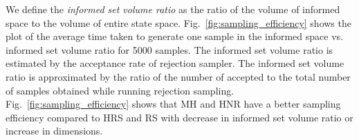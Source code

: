 \documentclass[letterpaper, 10 pt, conference]{ieeeconf}  %
\begin{document}
We define the \emph{informed set volume ratio} as the ratio of the volume of informed space to the volume of entire state space.
Fig.~\ref{fig:sampling_efficiency} shows the plot of the average time taken to generate one sample in the informed space vs. informed set volume ratio for 5000 samples. 
The informed set volume ratio is estimated by the acceptance rate of rejection sampler.
The informed set volume ratio is approximated by the ratio of the number of accepted to the total number of samples obtained while running rejection sampling. 
Fig.~\ref{fig:sampling_efficiency} shows that MH and HNR have a better sampling efficiency compared to HRS and RS with decrease in informed set volume ratio or increase in dimensions. 
\end{document}
